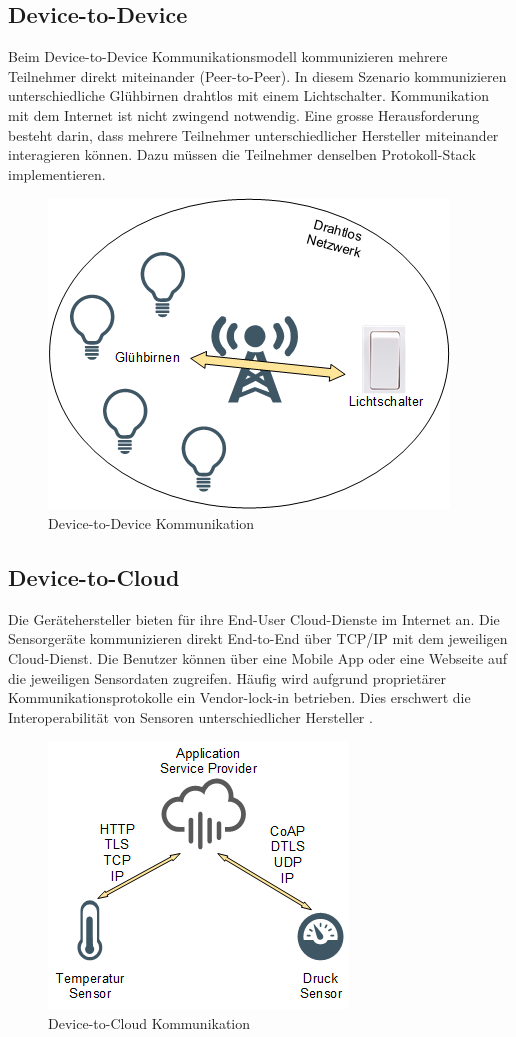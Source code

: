 \subsection{Device-to-Device}
Beim Device-to-Device Kommunikationsmodell kommunizieren mehrere Teilnehmer direkt miteinander (Peer-to-Peer). In diesem Szenario kommunizieren unterschiedliche Glühbirnen drahtlos mit einem Lichtschalter. Kommunikation mit dem Internet ist nicht zwingend notwendig. Eine grosse Herausforderung besteht darin, dass mehrere Teilnehmer unterschiedlicher Hersteller miteinander interagieren können. Dazu müssen die Teilnehmer denselben Protokoll-Stack implementieren. 
\begin{figure}[H]
\centering
\includegraphics[scale=0.8]{images/device-to-device.png}
\caption{Device-to-Device Kommunikation}
\end{figure}
\subsection{Device-to-Cloud}
Die Gerätehersteller bieten für ihre End-User Cloud-Dienste im Internet an. Die Sensorgeräte kommunizieren direkt End-to-End über TCP/IP mit dem jeweiligen Cloud-Dienst. Die Benutzer können über eine Mobile App oder eine Webseite auf die jeweiligen Sensordaten zugreifen. Häufig wird aufgrund proprietärer Kommunikationsprotokolle ein Vendor-lock-in betrieben. Dies erschwert die Interoperabilität von Sensoren unterschiedlicher Hersteller \cite{RoseEldridgeChapin15}.
\begin{figure}[H]
\centering
\includegraphics[scale=0.8]{images/device-to-cloud.png}
\caption{Device-to-Cloud Kommunikation}
\end{figure}
